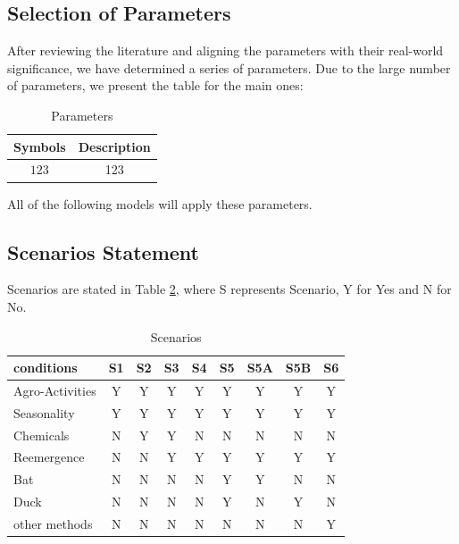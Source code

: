 \documentclass{HZNUMCM}
\begin{document}
    \subsection{Selection of Parameters}
      After reviewing the literature and aligning the parameters with their real-world significance, 
      we have determined a series of parameters. Due to the large number of parameters, 
      we present the table for the main ones:
      \begin{table}[H]
        \centering
        \caption{Parameters}
        \begin{tabular}{cc}
          \toprule
          \rowcolor{customcolor!40} %
          Symbols & Description\\
          \midrule
          $123$ & 123\\
          \bottomrule
        \end{tabular}
        \label{tab:Parameters}
      \end{table}
      All of the following models will apply these parameters. 
      
      \subsection{Scenarios Statement}
        Scenarios are stated in Table \ref{tab:Scenarios}, where S represents Scenario, Y for Yes and N for No.

        \begin{table}[H]
          \centering
          \caption{Scenarios}
          \begin{tabular}{lcccccccc}
            \toprule
            \rowcolor{customcolor!40} %
            conditions & S1 & S2 & S3 & S4 & S5 & S5A & S5B & S6 \\
            \midrule
            Agro-Activities & Y & Y & Y & Y & Y & Y & Y & Y \\
            Seasonality & Y & Y & Y & Y & Y & Y & Y & Y \\
            Chemicals & N & Y & Y & N & N & N & N & N \\
            Reemergence & N & N & Y & Y & Y & Y & Y & Y \\
            Bat & N & N & N & N & Y & Y & N & N \\
            Duck & N & N & N & N & Y & N & Y & N \\
            other methods & N & N & N & N & N & N & N & Y \\

            \bottomrule
          \end{tabular}
          \label{tab:Scenarios}
        \end{table}
\end{document}
